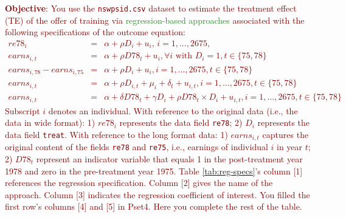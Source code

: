 \documentclass{article}
\begin{document}
\noindent \textcolor{Maroon}{\textbf{Objective}: You use the \texttt{nswpsid.csv} dataset to estimate the treatment effect (TE) of the offer of training via \textcolor{ForestGreen}{regression-based approaches} associated with the following specifications of the outcome equation:
\begin{eqnarray}
re78_{i} &=&\alpha +\rho D_{i}+u_{i}\text{, }i=1,...,2675\text{,}
\label{TCcomp} \\
earns_{i,t} &=& \alpha + \rho D78_{t}+u_{i}, \forall i \text{ with } D_i=1, t \in \{75,78\}  \label{BAfter} \\
earns_{i,78}-earns_{i,75} &=& \alpha + \rho D_i + u_{i}, i=1,\ldots,2675, t \in \{75,78\}  \label{FD} \\
earns_{i,t} &=& \alpha + \rho D_{i,t}+ \mu_i + \delta_t + u_{i,t}, i=1,\ldots,2675, t \in \{75,78\}   \label{TWFE} \\
earns_{i,t} &=& \alpha + \delta {D78}_{t} + \gamma D_i + \rho {D78}_t \times D_i +  u_{i,t}, i=1,\ldots,2675, t \in \{75,78\}  \label{DinD} 
\end{eqnarray}
\noindent Subscript $i$ denotes an individual. With reference to the original data (i.e., the data in wide format): 1) $re78_{i}$ represents the data field \texttt{re78}; 2) $D_{i}$ represents the data field \texttt{treat}. With reference to the long format data: 1) $earns_{i,t}$ captures the original content of the fields \texttt{re78} and \texttt{re75}, i.e., earnings of individual $i$ in year $t$; 2) ${D78}_{t}$ represent an indicator variable that equals 1 in the post-treatment year 1978 and zero in the pre-treatment year 1975. Table \ref{tab:reg-specs}'s column [1] references the regression specification. Column [2] gives the name of the approach. Column [3] indicates the regression coefficient of interest. You filled the first row's columns [4] and [5] in Pset4. Here you complete the rest of the table.}
\end{document}
